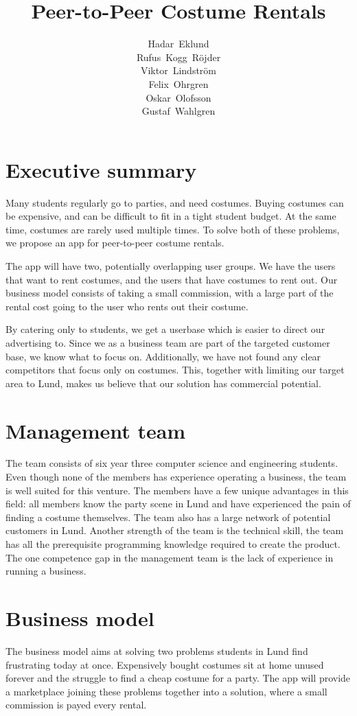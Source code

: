 \documentclass[a4paper, titlepage]{article}
\title{Peer-to-Peer Costume Rentals}
\author{Hadar~Eklund \\
        Rufus~Kogg~Röjder \\
        Viktor~Lindström \\
        Felix~Ohrgren \\
        Oskar~Olofsson \\
        Gustaf~Wahlgren}
\begin{document}
\maketitle

\section{Executive summary}
Many students regularly go to parties, and need costumes. Buying costumes can be expensive, and can be difficult to fit in a tight student budget. At the same time, costumes are rarely used multiple times. To solve both of these problems, we propose an app for peer-to-peer costume rentals.

The app will have two, potentially overlapping user groups. We have the users that want to rent costumes, and the users that have costumes to rent out. Our business model consists of taking a small commission, with a large part of the rental cost going to the user who rents out their costume.

By catering only to students, we get a userbase which is easier to direct our advertising to. Since we as a business team are part of the targeted customer base, we know what to focus on. Additionally, we have not found any clear competitors that focus only on costumes. This, together with limiting our target area to Lund, makes us believe that our solution has commercial potential.

\section{Management team}
The team consists of six year three computer science and engineering students. Even though none of the members has experience operating a business, the team is well suited for this venture. The members have a few unique advantages in this field: all members know the party scene in Lund and have experienced the pain of finding a costume themselves. The team also has a large network of potential customers in Lund. Another strength of the team is the technical skill, the team has all the prerequisite programming knowledge required to create the product. The one competence gap in the management team is the lack of experience in running a business.

\cite{https://doi.org/10.1111/j.1467-8616.2010.00719.x}

\section{Business model}
The business model aims at solving two problems students in Lund find frustrating today at once. Expensively bought costumes sit at home unused forever and the struggle to find a cheap costume for a party. The app will provide a marketplace joining these problems together into a solution, where a small commission is payed every rental.
\end{document}

